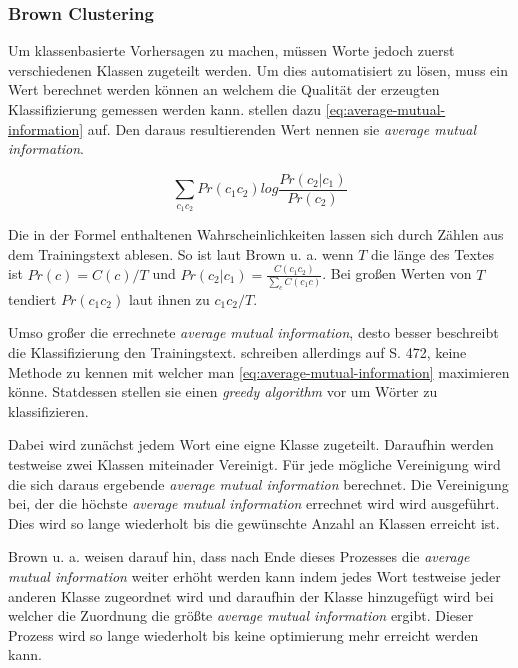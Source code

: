     \subsubsection*{Brown Clustering}
    	Um klassenbasierte Vorhersagen zu machen, müssen Worte jedoch zuerst verschiedenen Klassen zugeteilt werden. Um dies automatisiert zu lösen, muss ein Wert berechnet werden können an welchem die Qualität der erzeugten Klassifizierung gemessen werden kann. \parencite[S. 471]{cumpatationalLinguistics:classBasedNGramms} stellen dazu \autoref{eq:average-mutual-information} auf. Den daraus resultierenden Wert nennen sie \emph{average mutual information}.
        
        \begin{equation}
   			\sum_{c_1c_2} Pr(c_1 c_2) log \frac{Pr(c_2|c_1)}{Pr(c_2)}
        	\label{eq:average-mutual-information}
		\end{equation}
        
        Die in der Formel enthaltenen Wahrscheinlichkeiten lassen sich durch Zählen aus dem Trainingstext ablesen. So ist laut Brown u. a. wenn \(T\) die länge des Textes ist \(Pr(c) = C(c)/T\) und \(Pr(c_2|c_1) = \frac{C(c_1 c_2)}{\sum_c C(c_1 c)}\). Bei großen Werten von \(T\) tendiert \(Pr(c_1 c_2)\) laut ihnen zu \(c_1 c_2/T\).
        
        Umso großer die errechnete \emph{average mutual information}, desto besser beschreibt die Klassifizierung den Trainingstext. \cite{cumpatationalLinguistics:classBasedNGramms} schreiben allerdings auf S. 472, keine Methode zu kennen mit welcher man \autoref{eq:average-mutual-information} maximieren könne. Statdessen stellen sie einen \emph{greedy algorithm} vor um Wörter zu klassifizieren.
        
        Dabei wird zunächst jedem Wort eine eigne Klasse zugeteilt. Daraufhin werden testweise zwei Klassen miteinader Vereinigt. Für jede mögliche Vereinigung wird die sich daraus ergebende \emph{average mutual information} berechnet. Die Vereinigung bei, der die höchste \emph{average mutual information} errechnet wird wird ausgeführt. Dies wird so lange wiederholt bis die gewünschte Anzahl an Klassen erreicht ist.
        
        Brown u. a. weisen darauf hin, dass nach Ende dieses Prozesses die \emph{average mutual information} weiter erhöht werden kann indem jedes Wort testweise jeder anderen Klasse zugeordnet wird und daraufhin der Klasse hinzugefügt wird bei welcher die Zuordnung die größte \emph{average mutual information} ergibt. Dieser Prozess wird so lange wiederholt bis keine optimierung mehr erreicht werden kann.
        
